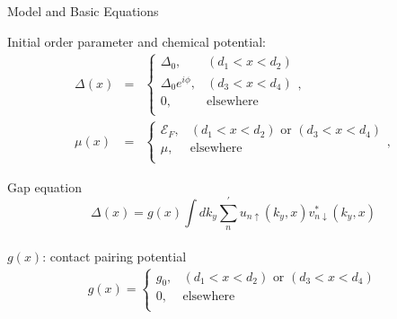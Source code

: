 \documentclass[]{beamer}
\begin{document}
 \begin{frame}{Model and Basic Equations}

Initial order parameter and chemical potential: 
\begin{eqnarray}
\Delta(x)&=&\left\{
\begin{array}{cc}
\Delta_0,&(d_1<x<d_2)\\
\Delta_0 e^{i\phi},& (d_3<x<d_4)\\
0,& \text{elsewhere}\\
\end{array} \right . ,\\
\mu(x)&=&\left\{
\begin{array}{cc}
\mathcal{E}_F,&(d_1<x<d_2) \text{ or } (d_3<x<d_4)\\
\mu,& \text{elsewhere}\\
\end{array} \right .,
\end{eqnarray}

Gap equation
\begin{equation}
\Delta(x)=g(x)\int  d k_y \sum_n^\prime u_{n\uparrow}(k_y, x)v^*_{n\downarrow}(k_y, x)
\end{equation}\label{gap-eq}
\\
$g(x)$: contact pairing potential
\begin{eqnarray}
g(x)=\left\{
\begin{array}{cc}
g_0,&(d_1<x<d_2) \text{ or } (d_3<x<d_4)\\
0,& \text{elsewhere}\\
\end{array} \right .
\end{eqnarray}

\end{frame} 
\end{document}
